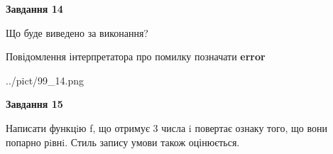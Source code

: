 \documentclass[11pt, ukrainian]{article}
\begin{document}
{\begin {large}
{\begin {center}\textbf{Завдання 14}\end {center}}\par
Що буде виведено за виконання? \par
Повідомлення інтерпретатора про помилку позначати \textbf{error}

\begin{center}
	{../pict/99_14.png}
\end{center}
\newpage

{\begin {center}\textbf{Завдання 15}\end {center}}\par

Написати функцiю f, що отримує 3 числа i повертає ознаку того, що вони попарно рiвнi. Стиль запису умови також оцінюється.\par
\newpage

\end {large}}
\end{document}
